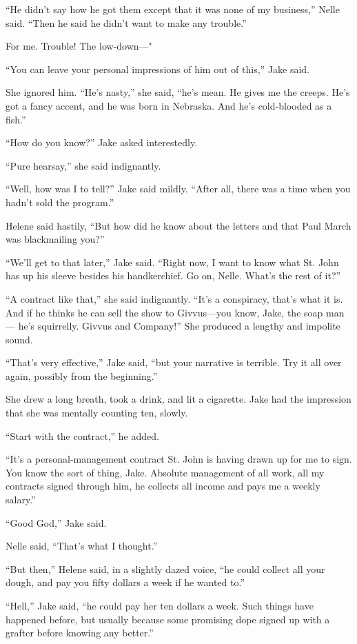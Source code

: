 \documentclass{novel}
\begin{document}
“He didn’t say how he got them except that it was none of my business,” Nelle said. “Then he said he didn’t want to make any trouble.”

For me. Trouble! The low-down—"

“You can leave your personal impressions of him out of this,” Jake said.

She ignored him. “He’s nasty,” she said, “he’s mean. He gives me the creeps. He’s got a fancy accent, and he was born in Nebraska. And he’s cold-blooded as a fish.”

“How do you know?” Jake asked interestedly.

“Pure hearsay,” she said indignantly.

“Well, how was I to tell?” Jake said mildly. “After all, there was a time when you hadn’t sold the program.”

Helene said hastily, “But how did he know about the letters and that Paul March was blackmailing you?”

“We’ll get to that later,” Jake said. “Right now, I want to know what St. John has up his sleeve besides his handkerchief. Go on, Nelle. What’s the rest of it?”

“A contract like that,” she said indignantly. “It’s a conspiracy, that’s what it is. And if he thinks he can sell the show to Givvus—you know, Jake, the soap man— he’s squirrelly. Givvus and Company!” She produced a lengthy and impolite sound.

“That’s very effective,” Jake said, “but your narrative is terrible. Try it all over again, possibly from the beginning.”

She drew a long breath, took a drink, and lit a cigarette. Jake had the impression that she was mentally counting ten, slowly.

“Start with the contract,” he added.

“It’s a personal-management contract St. John is having drawn up for me to sign. You know the sort of thing, Jake. Absolute management of all work, all my contracts signed through him, he collects all income and pays me a weekly salary.”

“Good God,” Jake said.

Nelle said, “That’s what I thought.”

“But then,” Helene said, in a slightly dazed voice, “he could collect all your dough, and pay you fifty dollars a week if he wanted to.”

“Hell,” Jake said, “he could pay her ten dollars a week. Such things have happened before, but usually because some promising dope signed up with a grafter before knowing any better.”
\end{document}

